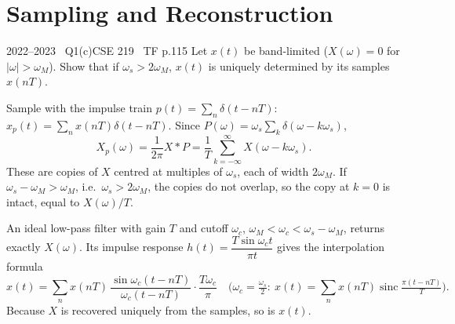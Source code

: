 \renewcommand{\teacherTag}{ASHRAF SIR \textbullet\ SAMPLING}
\chapter{Sampling and Reconstruction}


\begin{qcard}{2022--2023 \textbullet\ Q1(c)}{CSE 219 \textbullet\ TF p.1}{15}
Let $x(t)$ be band-limited ($X(\omega)=0$ for $|\omega|>\omega_M$). Show that if $\omega_s>2\omega_M$, $x(t)$ is uniquely determined by its samples $x(nT)$.
\end{qcard}
\begin{solution}
Sample with the impulse train $p(t)=\sum_n\delta(t-nT)$: $x_p(t)=\sum_nx(nT)\delta(t-nT)$. Since $P(\omega)=\omega_s\sum_k\delta(\omega-k\omega_s)$,
\[X_p(\omega)=\frac1{2\pi}X*P=\frac1T\sum_{k=-\infty}^{\infty}X(\omega-k\omega_s).\]
These are copies of $X$ centred at multiples of $\omega_s$, each of width $2\omega_M$. If $\omega_s-\omega_M>\omega_M$, i.e.\ $\omega_s>2\omega_M$, the copies do not overlap, so the copy at $k=0$ is intact, equal to $X(\omega)/T$.

An ideal low-pass filter with gain $T$ and cutoff $\omega_c$, $\omega_M<\omega_c<\omega_s-\omega_M$, returns exactly $X(\omega)$. Its impulse response $h(t)=\dfrac{T\sin\omega_ct}{\pi t}$ gives the interpolation formula
\[x(t)=\sum_nx(nT)\,\frac{\sin\omega_c(t-nT)}{\omega_c(t-nT)}\cdot\frac{T\omega_c}{\pi}\quad\Big(\omega_c=\tfrac{\omega_s}2:\ x(t)=\sum_nx(nT)\operatorname{sinc}\tfrac{\pi(t-nT)}T\Big).\]
Because $X$ is recovered uniquely from the samples, so is $x(t)$.
\end{solution}

